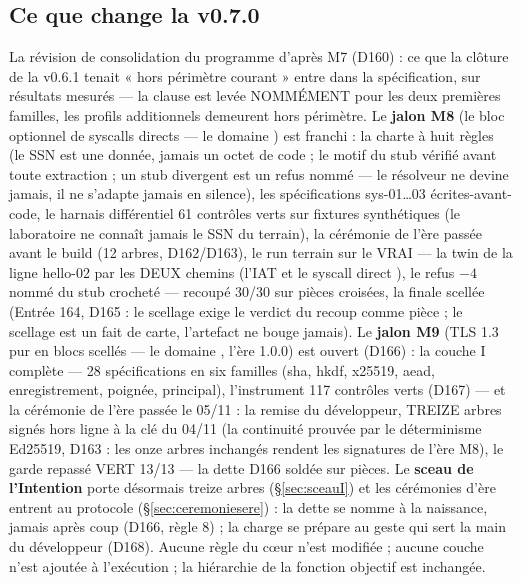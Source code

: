 \subsection{Ce que change la v0.7.0}\label{sec:nouveautes070}

La révision de consolidation du programme d'après M7 (D160) : ce que la clôture de la
v0.6.1 tenait « hors périmètre courant » entre dans la spécification, sur résultats
mesurés — la clause est levée NOMMÉMENT pour les deux premières familles, les profils
additionnels demeurent hors périmètre. Le \textbf{jalon M8} (le bloc optionnel de
syscalls directs — le domaine ) est franchi : la charte à huit règles (le SSN
est une donnée, jamais un octet de code ; le motif du stub vérifié avant toute
extraction ; un stub divergent est un refus nommé — le résolveur ne devine jamais, il ne
s'adapte jamais en silence), les spécifications sys-01…03 écrites-avant-code, le harnais
différentiel 61 contrôles verts sur fixtures  synthétiques (le laboratoire
ne connaît jamais le SSN du terrain), la cérémonie de l'ère passée avant le build (12
arbres, D162/D163), le run terrain sur le VRAI  — la twin de la ligne
hello-02 par les DEUX chemins (l'IAT  et le syscall direct
), le refus $-4$ nommé du stub crocheté — recoupé 30/30 sur pièces
croisées, la finale  scellée (Entrée 164, D165 : le scellage exige le
verdict du recoup comme pièce ; le scellage est un fait de carte, l'artefact ne bouge
jamais). Le \textbf{jalon M9} (TLS 1.3 pur en blocs scellés — le domaine ,
l'ère 1.0.0) est ouvert (D166) : la couche I complète — 28 spécifications en six
familles (sha, hkdf, x25519, aead, enregistrement, poignée, principal), l'instrument
 117 contrôles verts (D167) — et la cérémonie de l'ère
passée le 05/11 : la remise du développeur, TREIZE arbres signés hors ligne à la clé du
04/11 (la continuité prouvée par le déterminisme Ed25519, D163 : les onze arbres
inchangés rendent les signatures de l'ère M8), le garde repassé VERT 13/13 — la dette
D166 soldée sur pièces. Le \textbf{sceau de l'Intention} porte désormais treize arbres
(§\ref{sec:sceauI}) et les cérémonies d'ère entrent au protocole
(§\ref{sec:ceremoniesere}) : la dette se nomme à la naissance, jamais après coup (D166,
règle 8) ; la charge se prépare au geste qui sert la main du développeur (D168). Aucune
règle du cœur n'est modifiée ; aucune couche n'est ajoutée à l'exécution ; la hiérarchie
de la fonction objectif est inchangée.

